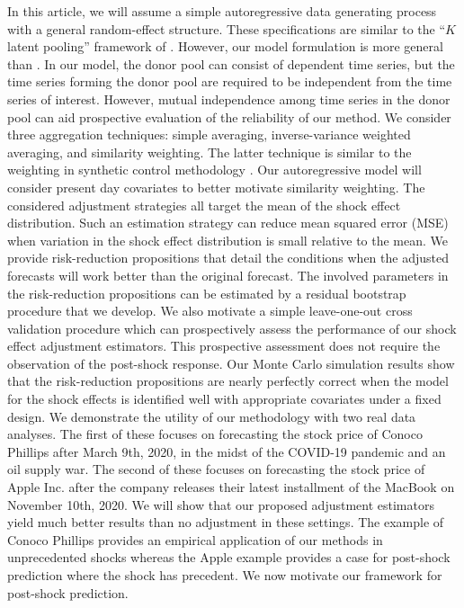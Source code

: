 \documentclass[11pt,3p,review,authoryear]{elsarticle}
\theoremstyle{definition}
\begin{document}
In this article, we will assume a simple autoregressive data generating process  with a general random-effect structure. These specifications are similar to the ``$K$ latent pooling'' framework of \cite{ramaswamy1993empirical}. However, our model formulation is more general than \cite{ramaswamy1993empirical}. In our model, the donor pool can consist of dependent time series, but the time series forming the donor pool are required to be independent from the time series of interest. However, mutual independence among time series in the donor pool can aid prospective evaluation of the reliability of our method. We consider three aggregation techniques: simple averaging, inverse-variance weighted averaging, and similarity weighting. The latter technique is similar to the weighting in synthetic control methodology \citep{abadie2010synthetic}. Our autoregressive model will consider present day covariates to better motivate similarity weighting. The considered adjustment strategies all target the mean of the shock effect distribution. Such an estimation strategy can reduce mean squared error (MSE) when variation in the shock effect distribution is small relative to the mean. We provide risk-reduction propositions that detail the conditions when the adjusted forecasts will work better than the original forecast. The involved parameters in the risk-reduction propositions can be estimated by a residual bootstrap procedure that we develop. We also motivate a simple leave-one-out cross validation procedure which can prospectively assess the performance of our shock effect adjustment estimators. This prospective assessment does not require the observation of the post-shock response. Our Monte Carlo simulation results show that the risk-reduction propositions are nearly perfectly correct when the model for the shock effects is identified well with appropriate covariates under a fixed design.  We demonstrate the utility of our methodology with two real data analyses. The first of these focuses on forecasting the stock price of Conoco Phillips after March 9th, 2020, in the midst of the COVID-19 pandemic and an oil supply war. The second of these focuses on forecasting the stock price of Apple Inc. after the company releases their latest installment of the MacBook on November 10th, 2020. We will show that our proposed adjustment estimators yield much better results than no adjustment in these settings. The example of Conoco Phillips provides an empirical application of our methods in unprecedented shocks whereas the Apple example provides a case for post-shock prediction where the shock has precedent. We now motivate our framework for post-shock prediction.
\end{document}
